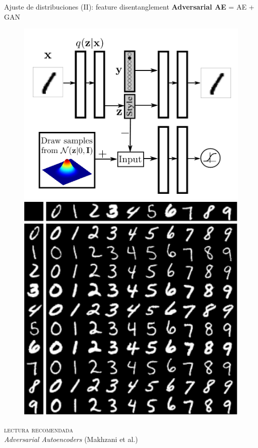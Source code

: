 \documentclass[13.5pt,aspectratio=169]{beamer}
\begin{document}
     \begin{frame}{Ajuste de distribuciones (II): feature disentanglement}
      \centering
        \textbf{\color{colorblue}Adversarial AE} = AE + GAN
     
     \begin{figure}[ht!]
        \centering\hfill
        \includegraphics[height=.3\linewidth]{images/supaae.png}\hfill
        \includegraphics[height=.3\linewidth]{images/ae-disentange.png}\hfill
     \label{fig:sampledfaces}
     \end{figure}\flushleft
     \textsc{\color{colorblue}lectura recomendada}\\
     \textit{Adversarial Autoencoders} (Makhzani {\scriptsize et al.})
     \end{frame}
\end{document}

